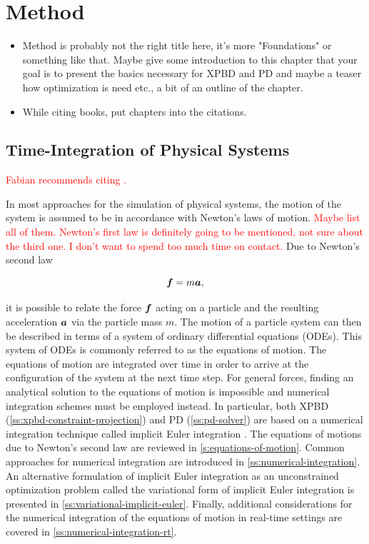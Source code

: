 \chapter{Method}\label{ch:method}

\begin{itemize}
    \item Method is probably not the right title here, it's more "Foundations" or something like that.
        Maybe give some introduction to this chapter that your goal is to present the basics necessary for XPBD and 
        PD and maybe a teaser how optimization is need etc., a bit of an outline of the chapter.
    \item While citing books, put chapters into the citations.
\end{itemize}

\section{Time-Integration of Physical Systems}\label{s:physical-integration}
\textcolor{red}{Fabian recommends citing \cite{gast2015}.}

In most approaches for the simulation of physical systems, the motion of the system is assumed to be in accordance with Newton's laws of
motion. \textcolor{red}{Maybe list all of them. Newton's first law is definitely going to be mentioned, not sure about the third one. I
don't want to spend too much time on contact.} Due to Newton's second law 

\begin{equation}\label{newtons-laws-2}
    \bm{f} = m\bm{a},
\end{equation}

\noindent it is possible to relate the force $\bm{f}$ acting on a particle and the resulting acceleration $\bm{a}$ via the particle
mass $m$. The motion of a particle system can then be described in terms of a system of ordinary differential equations (ODEs). This
system of ODEs is commonly referred to as the equations of motion. The equations of motion are integrated over time in order to arrive 
at the configuration of the system at the next time step. For general forces, finding an analytical solution to the equations of motion
is impossible and numerical integration schemes must be employed instead. In particular, both XPBD (\cref{ss:xpbd-constraint-projection}) 
and PD (\cref{ss:pd-solver}) are based on a numerical 
integration technique called implicit Euler integration \cite{macklin2016, bouaziz2014}. The equations of motions due to Newton's second 
law are reviewed in \cref{s:equations-of-motion}. Common approaches for numerical integration are introduced in 
\cref{ss:numerical-integration}. An alternative formulation of implicit Euler integration as an unconstrained optimization problem
called the variational form of implicit Euler integration is presented in \cref{ss:variational-implicit-euler}. Finally, additional 
considerations for the numerical integration of the equations of motion in real-time settings are covered in 
\cref{ss:numerical-integration-rt}.

